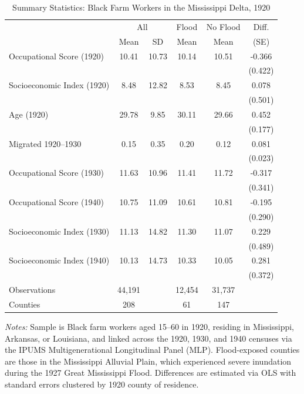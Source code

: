 \begin{table}[t]
\centering
\caption{Summary Statistics: Black Farm Workers in the Mississippi Delta, 1920}
\label{tab:summary}
\begin{tabular}{lccccc}
\toprule
 & \multicolumn{2}{c}{All} & \multicolumn{1}{c}{Flood} & \multicolumn{1}{c}{No Flood} & \multicolumn{1}{c}{Diff.} \\
 & Mean & SD & Mean & Mean & (SE) \\
\midrule
Occupational Score (1920) & 10.41 & 10.73 & 10.14 & 10.51 & -0.366 \\
 & & & & & (0.422) \\
Socioeconomic Index (1920) & 8.48 & 12.82 & 8.53 & 8.45 & 0.078 \\
 & & & & & (0.501) \\
Age (1920) & 29.78 & 9.85 & 30.11 & 29.66 & 0.452 \\
 & & & & & (0.177) \\
Migrated 1920--1930 & 0.15 & 0.35 & 0.20 & 0.12 & 0.081 \\
 & & & & & (0.023) \\
Occupational Score (1930) & 11.63 & 10.96 & 11.41 & 11.72 & -0.317 \\
 & & & & & (0.341) \\
Occupational Score (1940) & 10.75 & 11.09 & 10.61 & 10.81 & -0.195 \\
 & & & & & (0.290) \\
Socioeconomic Index (1930) & 11.13 & 14.82 & 11.30 & 11.07 & 0.229 \\
 & & & & & (0.489) \\
Socioeconomic Index (1940) & 10.13 & 14.73 & 10.33 & 10.05 & 0.281 \\
 & & & & & (0.372) \\
\midrule
Observations & 44,191 & & 12,454 & 31,737 & \\
Counties & 208 & & 61 & 147 & \\
\bottomrule
\end{tabular}
\par\vspace{0.3em}
{\footnotesize
\textit{Notes:} Sample is Black farm workers aged 15--60 in 1920, residing in Mississippi, Arkansas, or Louisiana, and linked across the 1920, 1930, and 1940 censuses via the IPUMS Multigenerational Longitudinal Panel (MLP). Flood-exposed counties are those in the Mississippi Alluvial Plain, which experienced severe inundation during the 1927 Great Mississippi Flood. Differences are estimated via OLS with standard errors clustered by 1920 county of residence.
}
\end{table}
